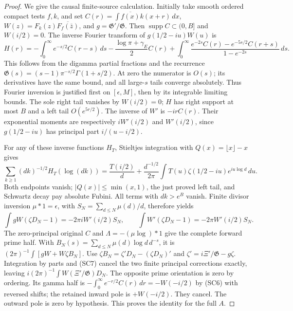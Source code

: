 \documentclass[11pt]{article}
\theoremstyle{remark}\newtheorem{remark}[theorem]{Remark}
\begin{document}
\begin{proof}
We give the causal finite-source calculation. Initially take
smooth ordered compact tests \(f,k\), and set
\(C(r)=\int\overline{f(x)}k(x+r)\,dx\),
\(W(z)=F_k(z)\overline{F_f(\bar z)}\), and
\(g=\mathfrak G'/\mathfrak G\).
Then \(\operatorname{supp}C\subset(0,B]\) and \(W(i/2)=0\).
The inverse Fourier transform of \(g(1/2-iu)W(u)\) is
\[
 H(r)=-\int_0^\infty e^{-s/2}C(r-s)\,ds
 -\frac{\log\pi+\gamma_E}{2}C(r)
 +\int_0^\infty
 \frac{e^{-2s}C(r)-e^{-5s/2}C(r+s)}{1-e^{-2s}}\,ds.
                                                               \tag{SC6}
\]
This follows from the digamma partial fractions and the recurrence
\(\mathfrak G(s)=(s-1)\pi^{-s/2}\Gamma(1+s/2)\).
At zero the numerator is \(O(s)\); its derivatives have the same
bound, and all large-\(s\) tails converge absolutely.
Thus Fourier inversion is justified first on
\([\epsilon,M]\), then by its integrable limiting bounds.
The sole right tail vanishes by \(W(i/2)=0\);
\(H\) has right support at most \(B\) and a left tail
\(O(e^{5r/2})\). The inverse of \(W'\) is \(-irC(r)\).
Their exponential moments are respectively
\(iW'(i/2)\) and \(W'(i/2)\), since \(g(1/2-iu)\)
has principal part \(i/(u-i/2)\).

For any of these inverse functions \(H_T\), Stieltjes
integration with \(Q(x)=\lfloor x\rfloor-x\) gives
\[
 \sum_{k\ge1}(dk)^{-1/2}H_T(\log(dk))
 =\frac{T(i/2)}d+
 \frac{d^{-1/2}}{2\pi}\int T(u)\zeta(1/2-iu)e^{iu\log d}\,du.
\]
Both endpoints vanish; \(|Q(x)|\le\min(x,1)\), the just
proved left tail, and Schwartz decay pay absolute Fubini.
All terms with \(dk>e^B\) vanish. Finite divisor inversion
\(\mu*1=\epsilon\), with
\(S_N=\sum_{d\le N}\mu(d)/d\), therefore yields
\[
 \int gW(\zeta D_N-1)=-2\pi iW'(i/2)S_N,\qquad
 \int W'(\zeta D_N-1)=-2\pi W'(i/2)S_N.             \tag{SC7}
\]
The zero-principal original \(C\) and
\(\Lambda=-(\mu\log)*1\) give the complete forward prime
half. With \(B_N(s)=\sum_{d\le N}\mu(d)\log d\,d^{-s}\),
it is \((2\pi)^{-1}\int[gW+W\zeta B_N]\).
Use \(\zeta B_N=\zeta'D_N-(\zeta D_N)'\) and
\(\zeta'=i\Xi'/\mathfrak G-g\zeta\).
Integration by parts and (SC7) cancel the two finite principal
corrections exactly, leaving \(i(2\pi)^{-1}\int
W(\Xi'/\mathfrak G)D_N\).
The opposite prime orientation is zero by ordering. Its gamma
half is \(-\int_0^\infty e^{-r/2}C(r)\,dr=-W(-i/2)\)
by (SC6) with reversed shifts; the retained inward pole is
\(+W(-i/2)\). They cancel. The outward pole is zero by
hypothesis. This proves the identity for the full \(A\).


\end{proof}
\end{document}
